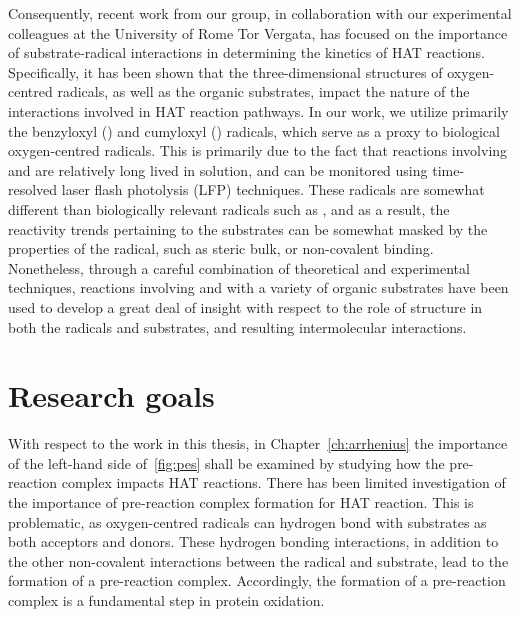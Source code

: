 Consequently, recent work from our group, in collaboration with our experimental colleagues at the University of Rome Tor Vergata, has focused on the importance of substrate-radical interactions in determining the kinetics of HAT reactions. Specifically, it has been shown that the three-dimensional structures of oxygen-centred radicals, as well as the organic substrates, impact the nature of the interactions involved in HAT reaction pathways.\cite{Salamone2015Rev} In our work, we utilize primarily the benzyloxyl (\bno) and cumyloxyl (\cumo) radicals, which serve as a proxy to biological oxygen-centred radicals. This is primarily due to the fact that reactions involving \bno and \cumo are relatively long lived in solution, and can be monitored using time-resolved laser flash photolysis (LFP) techniques. These radicals are somewhat different than biologically relevant radicals such as , and as a result, the reactivity trends pertaining to the substrates can be somewhat masked by the properties of the radical, such as steric bulk,\cite{Finn2004} or non-covalent binding.\cite{Salamone2011b} Nonetheless, through a careful combination of theoretical and experimental techniques, reactions involving \bno and \cumo with a variety of organic substrates have been used to develop a great deal of insight with respect to the role of structure in both the radicals and substrates, and resulting intermolecular interactions.

\section{Research goals}

With respect to the work in this thesis, in Chapter~\ref{ch:arrhenius} the importance of the left-hand side of~\ref{fig:pes} shall be examined by studying how the pre-reaction complex impacts HAT reactions. There has been limited investigation of the importance of pre-reaction complex formation for HAT reaction.\cite{Kreilick1966} This is problematic, as oxygen-centred radicals can hydrogen bond with substrates as both acceptors and donors.\cite{Johnson2009a} These hydrogen bonding interactions, in addition to the other non-covalent interactions between the radical and substrate, lead to the formation of a pre-reaction complex. Accordingly, the formation of a pre-reaction complex is a fundamental step in protein oxidation.

